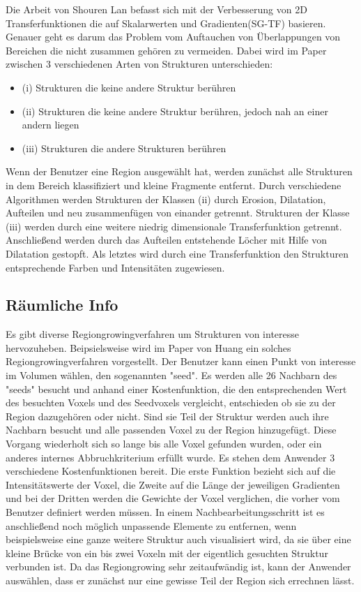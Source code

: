 Die Arbeit von Shouren Lan \cite{lan2017improving} befasst sich mit der Verbesserung von 2D Transferfunktionen die auf Skalarwerten und Gradienten(SG-TF) basieren. Genauer geht es darum das Problem vom Auftauchen von Überlappungen von Bereichen die nicht zusammen gehören zu vermeiden.
\newline
Dabei wird im Paper zwischen 3 verschiedenen Arten von Strukturen unterschieden:
\begin{itemize}
\item (i) Strukturen die keine andere Struktur berühren
\item (ii) Strukturen die keine andere Struktur berühren, jedoch nah an einer andern liegen
\item (iii) Strukturen die andere Strukturen berühren
\end{itemize} 
Wenn der Benutzer eine Region ausgewählt hat, werden zunächst alle Strukturen in dem Bereich klassifiziert und kleine Fragmente entfernt. Durch verschiedene Algorithmen werden Strukturen der Klassen (ii) durch Erosion, Dilatation, Aufteilen und neu zusammenfügen von einander getrennt. Strukturen der Klasse (iii) werden durch eine weitere niedrig dimensionale Transferfunktion getrennt. Anschließend werden durch das Aufteilen entstehende Löcher mit Hilfe von Dilatation gestopft. Als letztes wird durch eine Transferfunktion den Strukturen entsprechende Farben und Intensitäten zugewiesen.


\subsection{Räumliche Info}


Es gibt diverse Regiongrowingverfahren um Strukturen von interesse hervozuheben.
\newline
Beipsielsweise wird im Paper von Huang \cite{huang2003rgvis} ein solches Regiongrowingverfahren vorgestellt.
\newline
Der Benutzer kann einen Punkt von interesse im Volumen wählen, den sogenannten "seed". Es werden alle 26 Nachbarn des "seeds" besucht und anhand einer Kostenfunktion, die den entsprechenden Wert des besuchten Voxels und des Seedvoxels vergleicht, entschieden ob sie zu der Region dazugehören oder nicht. Sind sie Teil der Struktur werden auch ihre Nachbarn besucht und alle passenden Voxel zu der Region hinzugefügt. Diese Vorgang wiederholt sich so lange bis alle Voxel gefunden wurden, oder ein anderes internes Abbruchkriterium erfüllt wurde.  Es stehen dem Anwender 3 verschiedene Kostenfunktionen bereit. Die erste Funktion bezieht sich auf die Intensitätswerte der Voxel, die Zweite auf die Länge der jeweiligen Gradienten und bei der Dritten werden die Gewichte der Voxel verglichen, die vorher vom Benutzer definiert werden müssen. In einem Nachbearbeitungsschritt ist es anschließend noch möglich unpassende Elemente zu entfernen, wenn beispielsweise eine ganze weitere Struktur auch visualisiert wird, da sie über eine kleine Brücke von ein bis zwei Voxeln mit der eigentlich gesuchten Struktur verbunden ist.
\newline
Da das Regiongrowing sehr zeitaufwändig ist, kann der Anwender auswählen, dass er zunächst nur eine gewisse Teil der Region sich errechnen lässt.



